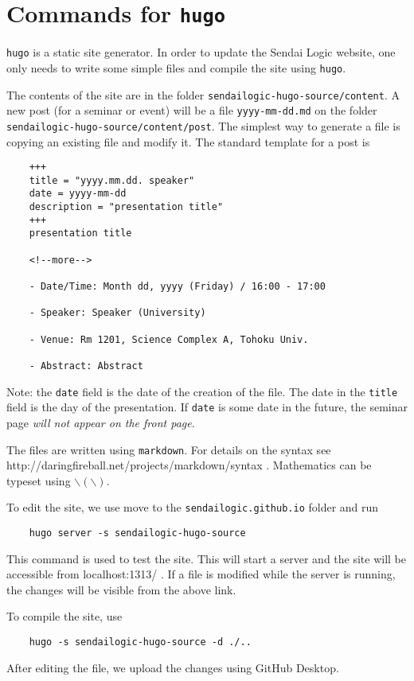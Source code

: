 \documentclass[a4paper]{article}
\begin{document}
\section{Commands for \texttt{hugo}}
\texttt{hugo} is a static site generator.
In order to update the Sendai Logic website, one only needs to write some simple files and compile the site using \texttt{hugo}.

The contents of the site are in the folder \texttt{sendailogic-hugo-source/content}.
A new post (for a seminar or event) will be a file \texttt{yyyy-mm-dd.md} on the folder \texttt{sendailogic-hugo-source/content/post}.
The simplest way to generate a file is copying an existing file and modify it.
The standard template for a post is
\begin{verbatim}
    +++
    title = "yyyy.mm.dd. speaker"
    date = yyyy-mm-dd
    description = "presentation title"
    +++
    presentation title

    <!--more-->

    - Date/Time: Month dd, yyyy (Friday) / 16:00 - 17:00

    - Speaker: Speaker (University)

    - Venue: Rm 1201, Science Complex A, Tohoku Univ.

    - Abstract: Abstract
\end{verbatim}
Note: the \texttt{date} field is the date of the creation of the file.
The date in the \texttt{title} field is the day of the presentation.
If \texttt{date} is some date in the future, the seminar page {\em will not appear on the front page}.

The files are written using \texttt{markdown}. For details on the syntax see http://daringfireball.net/projects/markdown/syntax . Mathematics can be typeset using $\backslash( \backslash)$.

To edit the site, we use move to the \texttt{sendailogic.github.io} folder and run
\begin{verbatim}
    hugo server -s sendailogic-hugo-source
\end{verbatim}
This command is used to test the site.
This will start a server and the site will be accessible from localhost:1313/ .
If a file is modified while the server is running, the changes will be visible from the above link.

To compile the site, use
\begin{verbatim}
    hugo -s sendailogic-hugo-source -d ./..
\end{verbatim}
After editing the file, we upload the changes using GitHub Desktop.
\end{document}
